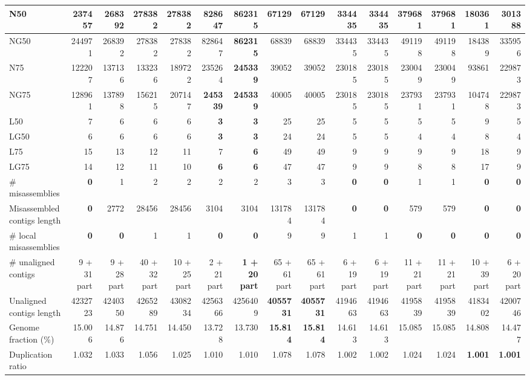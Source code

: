 \documentclass[12pt,a4paper]{article}
\begin{document}
\begin{table}[ht]
\begin{center}
\begin{tabular}{|l*{14}{|r}|}
N50 & 237457 & 268392 & 278382 & 278382 & 828647 & {\bf 862315} & 67129 & 67129 & 334435 & 334435 & 379681 & 379681 & 180361 & 301388 \\ \hline
NG50 & 244971 & 268392 & 278382 & 278382 & 828647 & {\bf 862315} & 68839 & 68839 & 334435 & 334435 & 491198 & 491198 & 184389 & 335956 \\ \hline
N75 & 122207 & 137136 & 133236 & 189722 & 235264 & {\bf 245339} & 39052 & 39052 & 230185 & 230185 & 230049 & 230049 & 93861 & 229873 \\ \hline
NG75 & 128961 & 137898 & 156215 & 207147 & {\bf 245339} & {\bf 245339} & 40005 & 40005 & 230185 & 230185 & 237931 & 237931 & 104748 & 229873 \\ \hline
L50 & 7 & 6 & 6 & 6 & {\bf 3} & {\bf 3} & 25 & 25 & 5 & 5 & 5 & 5 & 9 & 5 \\ \hline
LG50 & 6 & 6 & 6 & 6 & {\bf 3} & {\bf 3} & 24 & 24 & 5 & 5 & 4 & 4 & 8 & 4 \\ \hline
L75 & 15 & 13 & 12 & 11 & 7 & {\bf 6} & 49 & 49 & 9 & 9 & 9 & 9 & 18 & 9 \\ \hline
LG75 & 14 & 12 & 11 & 10 & {\bf 6} & {\bf 6} & 47 & 47 & 9 & 9 & 8 & 8 & 17 & 9 \\ \hline
\# misassemblies & {\bf 0} & 1 & 2 & 2 & 2 & 2 & 3 & 3 & {\bf 0} & {\bf 0} & 1 & 1 & {\bf 0} & {\bf 0} \\ \hline
Misassembled contigs length & {\bf 0} & 2772 & 28456 & 28456 & 3104 & 3104 & 131784 & 131784 & {\bf 0} & {\bf 0} & 579 & 579 & {\bf 0} & {\bf 0} \\ \hline
\# local misassemblies & {\bf 0} & {\bf 0} & 1 & 1 & {\bf 0} & {\bf 0} & 9 & 9 & 1 & 1 & {\bf 0} & {\bf 0} & {\bf 0} & {\bf 0} \\ \hline
\# unaligned contigs & 9 + 31 part & 9 + 28 part & 40 + 32 part & 10 + 25 part & 2 + 21 part & {\bf 1 + 20 part} & 65 + 61 part & 65 + 61 part & 6 + 19 part & 6 + 19 part & 11 + 21 part & 11 + 21 part & 10 + 39 part & 6 + 20 part \\ \hline
Unaligned contigs length & 4232723 & 4240350 & 4265289 & 4308234 & 4256366 & 4256409 & {\bf 4055731} & {\bf 4055731} & 4194663 & 4194663 & 4195839 & 4195839 & 4183402 & 4200746 \\ \hline
Genome fraction (\%) & 15.006 & 14.876 & 14.751 & 14.450 & 13.728 & 13.730 & {\bf 15.814} & {\bf 15.814} & 14.613 & 14.613 & 15.085 & 15.085 & 14.808 & 14.477 \\ \hline
Duplication ratio & 1.032 & 1.033 & 1.056 & 1.025 & 1.010 & 1.010 & 1.078 & 1.078 & 1.002 & 1.002 & 1.024 & 1.024 & {\bf 1.001} & {\bf 1.001} \\ \hline

\end{tabular}
\end{center}
\end{table}
\end{document}

